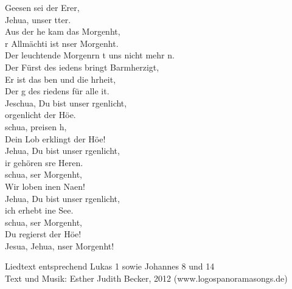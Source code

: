 
Geesen sei der Erer,\\ 
Jehua, unser tter.\\
Aus der he kam das Morgenht, \\
r Allmächti ist nser Morgenht.\\

Der leuchtende Morgenrn t uns nicht mehr n.\\ 
Der Fürst des iedens bringt Barmherzigt,\\
Er ist das ben und die hrheit, \\
Der g des riedens für alle it.\\

Jeschua, Du bist unser rgenlicht,\\
orgenlicht  der Höe.\\
schua,  preisen h,\\
Dein Lob erklingt  der Höe!\\

Jehua, Du bist unser rgenlicht,\\
ir gehören sre Heren.\\
schua, ser Morgenht,\\
Wir loben inen Naen!\\

Jehua, Du bist unser rgenlicht,\\
ich erhebt ine See.\\
schua, ser Morgenht,\\
Du regierst  der Höe!\\

Jesua, Jehua, nser Morgenht!\\

\begin{footnotesize}
Liedtext entsprechend Lukas 1 sowie Johannes 8 und 14\\
Text und Musik: Esther Judith Becker, 2012 (www.logospanoramasongs.de)
\end{footnotesize}